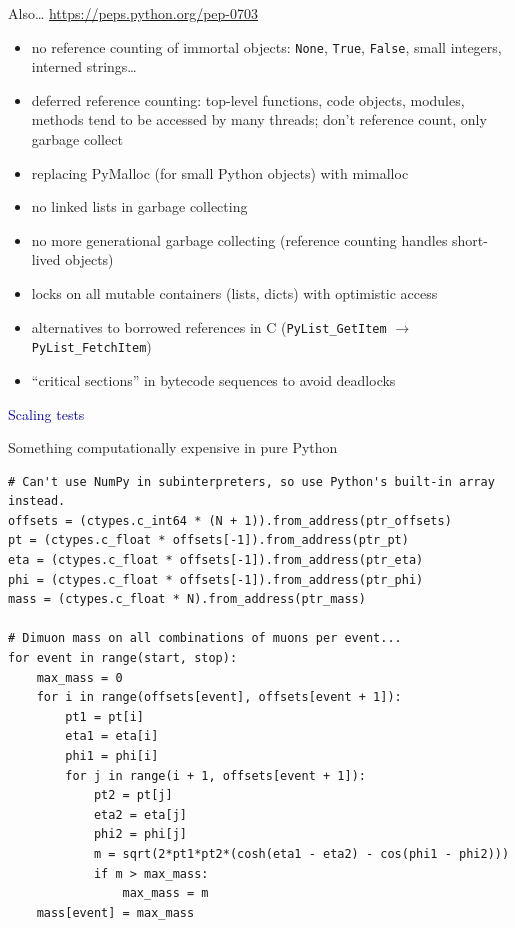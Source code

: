 \documentclass[aspectratio=169]{beamer}
\begin{document}
\begin{frame}{Also\ldots \hspace{5 cm} \small\url{https://peps.python.org/pep-0703}}
\vspace{0.5 cm}
\large
\begin{itemize}
\item no reference counting of immortal objects: \texttt{None}, \texttt{True}, \texttt{False}, small integers, interned strings\ldots
\item deferred reference counting: top-level functions, code objects, modules, methods tend to be accessed by many threads; don't reference count, only garbage collect
\item replacing PyMalloc (for small Python objects) with mimalloc
\item no linked lists in garbage collecting
\item no more generational garbage collecting (reference counting handles short-lived objects)
\item locks on all mutable containers (lists, dicts) with optimistic access
\item alternatives to borrowed references in C (\texttt{PyList_GetItem} $\to$ \texttt{PyList_FetchItem})
\item ``critical sections'' in bytecode sequences to avoid deadlocks
\end{itemize}
\end{frame}

\begin{frame}
\vspace{1 cm}
\LARGE
\begin{center}
\textcolor{darkblue}{Scaling tests}
\end{center}
\end{frame}

\begin{frame}[fragile]{Something computationally expensive in pure Python}
\vspace{0.4 cm}
\scriptsize
\begin{verbatim}
# Can't use NumPy in subinterpreters, so use Python's built-in array instead.
offsets = (ctypes.c_int64 * (N + 1)).from_address(ptr_offsets)
pt = (ctypes.c_float * offsets[-1]).from_address(ptr_pt)
eta = (ctypes.c_float * offsets[-1]).from_address(ptr_eta)
phi = (ctypes.c_float * offsets[-1]).from_address(ptr_phi)
mass = (ctypes.c_float * N).from_address(ptr_mass)

# Dimuon mass on all combinations of muons per event...
for event in range(start, stop):
    max_mass = 0
    for i in range(offsets[event], offsets[event + 1]):
        pt1 = pt[i]
        eta1 = eta[i]
        phi1 = phi[i]
        for j in range(i + 1, offsets[event + 1]):
            pt2 = pt[j]
            eta2 = eta[j]
            phi2 = phi[j]
            m = sqrt(2*pt1*pt2*(cosh(eta1 - eta2) - cos(phi1 - phi2)))
            if m > max_mass:
                max_mass = m
    mass[event] = max_mass
\end{verbatim}
\end{frame}
\end{document}
